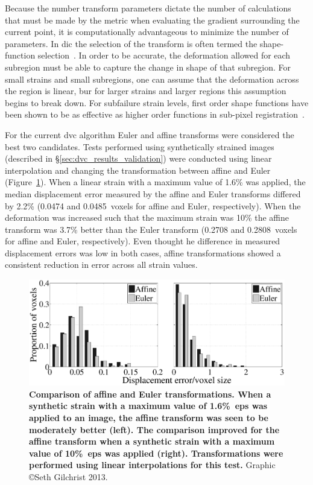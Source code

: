 Because the number transform parameters dictate the number of calculations that must be made by the metric when evaluating the gradient surrounding the current point, it is computationally advantageous to minimize the number of parameters.
In \ac{dic} the selection of the transform is often termed the shape-function selection~\citep{pan_two-dimensional_2009, lu_deformation_2000, schreier_systematic_2002}.
In order to be accurate, the deformation allowed for each subregion must be able to capture the change in shape of that subregion.
For small strains and small subregions, one can assume that the deformation across the region is linear, bur for larger strains and larger regions this assumption begins to break down.
For subfailure strain levels, first order shape functions have been shown to be as effective as higher order functions in sub-pixel registration~\citep{bing_performance_2006}.

For the current \ac{dvc} algorithm Euler and affine transforms were considered the best two candidates.
Tests performed using synthetically strained images (described in \S\ref{sec:dvc_results_validation}) were conducted using linear interpolation and changing the transformation between affine and Euler (Figure~\ref{fig:CompareTransforms}).
When a linear strain with a maximum value of 1.6\% was applied, the median displacement error measured by the affine and Euler transforms differed by 2.2\% (0.0474 and 0.0485~voxels for affine and Euler, respectively).
When the deformation was increased such that the maximum strain was 10\% the affine transform was 3.7\% better than the Euler transform (0.2708 and 0.2808~voxels for affine and Euler, respectively).
Even thought he difference in measured displacement errors was low in both cases, affine transformations showed a consistent reduction in error across all strain values.

\begin{figure}
\centering
\includegraphics[width=\linewidth]{./appendixDvc/figures/CompareTransforms}
\caption[Transformation comparisons]{\textbf{Comparison of affine and Euler transformations. When a synthetic strain with a maximum value of 1.6\%~\acs*{eps} was applied to an image, the affine transform was seen to be moderately better (left). The comparison improved for the affine transform when a synthetic strain with a maximum value of 10\%~\acs*{eps} was applied (right). Transformations were performed using linear interpolations for this test.} Graphic \copyright Seth Gilchrist 2013.}
\label{fig:CompareTransforms}
\end{figure}

